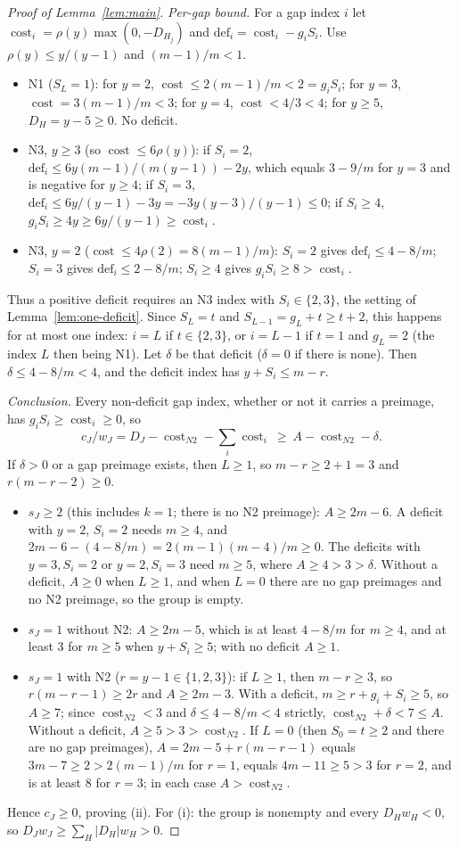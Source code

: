 \documentclass[11pt]{article}
\theoremstyle{remark}
\theoremstyle{definition}
\DeclareMathOperator{\cost}{cost}
\begin{document}
\begin{proof}[Proof of Lemma~\ref{lem:main}]
\emph{Per-gap bound.} For a gap index $i$ let $\cost_i=\rho(y)\max(0,-D_{H_j})$ and $\mathrm{def}_i=\cost_i-g_iS_i$. Use $\rho(y)\le y/(y-1)$ and $(m-1)/m<1$.
\begin{itemize}
\item N1 ($S_L=1$): for $y=2$, $\cost\le 2(m-1)/m<2=g_iS_i$; for $y=3$, $\cost=3(m-1)/m<3$; for $y=4$, $\cost<4/3<4$; for $y\ge5$, $D_H=y-5\ge0$. No deficit.
\item N3, $y\ge3$ (so $\cost\le 6\rho(y)$): if $S_i=2$, $\mathrm{def}_i\le 6y(m-1)/(m(y-1))-2y$, which equals $3-9/m$ for $y=3$ and is negative for $y\ge4$; if $S_i=3$, $\mathrm{def}_i\le 6y/(y-1)-3y=-3y(y-3)/(y-1)\le0$; if $S_i\ge4$, $g_iS_i\ge4y\ge 6y/(y-1)\ge\cost_i$.
\item N3, $y=2$ ($\cost\le4\rho(2)=8(m-1)/m$): $S_i=2$ gives $\mathrm{def}_i\le4-8/m$; $S_i=3$ gives $\mathrm{def}_i\le2-8/m$; $S_i\ge4$ gives $g_iS_i\ge8>\cost_i$.
\end{itemize}
Thus a positive deficit requires an N3 index with $S_i\in\{2,3\}$, the setting of Lemma~\ref{lem:one-deficit}. Since $S_L=t$ and $S_{L-1}=g_L+t\ge t+2$, this happens for at most one index: $i=L$ if $t\in\{2,3\}$, or $i=L-1$ if $t=1$ and $g_L=2$ (the index $L$ then being N1). Let $\delta$ be that deficit ($\delta=0$ if there is none). Then $\delta\le 4-8/m<4$, and the deficit index has $y+S_i\le m-r$.

\emph{Conclusion.} Every non-deficit gap index, whether or not it carries a preimage, has $g_iS_i\ge\cost_i\ge0$, so
\[
c_J/w_J=D_J-\cost_{N2}-\sum_i\cost_i\ \ge\ A-\cost_{N2}-\delta.
\]
If $\delta>0$ or a gap preimage exists, then $L\ge1$, so $m-r\ge 2+1=3$ and $r(m-r-2)\ge0$.
\begin{itemize}
\item $s_J\ge2$ (this includes $k=1$; there is no N2 preimage): $A\ge2m-6$. A deficit with $y=2$, $S_i=2$ needs $m\ge4$, and $2m-6-(4-8/m)=2(m-1)(m-4)/m\ge0$. The deficits with $y=3,S_i=2$ or $y=2,S_i=3$ need $m\ge5$, where $A\ge4>3>\delta$. Without a deficit, $A\ge0$ when $L\ge1$, and when $L=0$ there are no gap preimages and no N2 preimage, so the group is empty.
\item $s_J=1$ without N2: $A\ge2m-5$, which is at least $4-8/m$ for $m\ge4$, and at least $3$ for $m\ge5$ when $y+S_i\ge5$; with no deficit $A\ge1$.
\item $s_J=1$ with N2 ($r=y-1\in\{1,2,3\}$): if $L\ge1$, then $m-r\ge3$, so $r(m-r-1)\ge2r$ and $A\ge2m-3$. With a deficit, $m\ge r+g_i+S_i\ge5$, so $A\ge7$; since $\cost_{N2}<3$ and $\delta\le4-8/m<4$ strictly, $\cost_{N2}+\delta<7\le A$. Without a deficit, $A\ge5>3>\cost_{N2}$. If $L=0$ (then $S_0=t\ge2$ and there are no gap preimages), $A=2m-5+r(m-r-1)$ equals $3m-7\ge2>2(m-1)/m$ for $r=1$, equals $4m-11\ge5>3$ for $r=2$, and is at least $8$ for $r=3$; in each case $A>\cost_{N2}$.
\end{itemize}
Hence $c_J\ge0$, proving (ii). For (i): the group is nonempty and every $D_Hw_H<0$, so $D_Jw_J\ge\sum_H|D_H|w_H>0$.
\end{proof}
\end{document}
